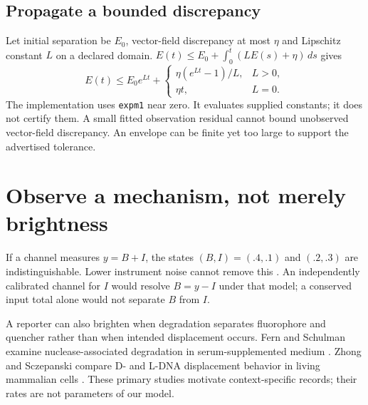 \subsection{Propagate a bounded discrepancy}
Let initial separation be $E_0$, vector-field discrepancy at most $\eta$ and
Lipschitz constant $L$ on a declared domain.
$E(t)\le E_0+\int_0^t(LE(s)+\eta)\,ds$ gives
\[
 E(t)\le E_0e^{Lt}+
 \begin{cases}\eta(e^{Lt}-1)/L,&L>0,\\\eta t,&L=0.\end{cases}
\]
The implementation uses \texttt{expm1} near zero. It evaluates supplied constants;
it does not certify them. A small fitted observation residual cannot bound
unobserved vector-field discrepancy. An envelope can be finite yet too large to
support the advertised tolerance.

\section{Observe a mechanism, not merely brightness}
If a channel measures $y=B+I$, the states $(B,I)=(.4,.1)$ and $(.2,.3)$ are
indistinguishable. Lower instrument noise cannot remove this
. An independently calibrated channel for
$I$ would resolve $B=y-I$ under that model; a conserved input total alone would
not separate $B$ from $I$.

A reporter can also brighten when degradation separates fluorophore and
quencher rather than when intended displacement occurs.
Fern and Schulman examine nuclease-associated degradation in serum-supplemented
medium \cite{dna31-fern}. Zhong and Sczepanski compare D- and L-DNA displacement
behavior in living mammalian cells \cite{dna31-zhong}. These primary studies
motivate context-specific records; their rates are not parameters of our model.

